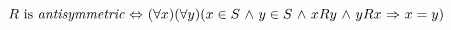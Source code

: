 \documentclass[11pt,paper=b5,footinclude,headinclude]{scrbook} %
\def\ali {{~\vee~}}
\def\inn {{~\wedge~}}
\def\sledi {{~\Rightarrow~}}
\def\brez {{\,\setminus\,}}
\def\cee {{~\Leftrightarrow~}}
\def\zgled{\paragraph{Example:}}
\def\kz{{\hfill{\S}}}%
\theoremstyle{remark}
\theoremstyle{definition} %
\theoremstyle{theorem} %
\begin{document}
%
%
%
%
%
%
%
%
%
%
%
%
%
%
%
%
%
%
%
%
%
%
%
%
%
%
%
%
%
%
%
%
%
%
%
%
%
%
%

\bigskip

$R \textrm{ is {\em antisymmetric}} \cee (\forall x)(\forall y)(x\in S\inn y\in S\inn xRy\inn yRx\sledi x = y)$
%
\end{document}

